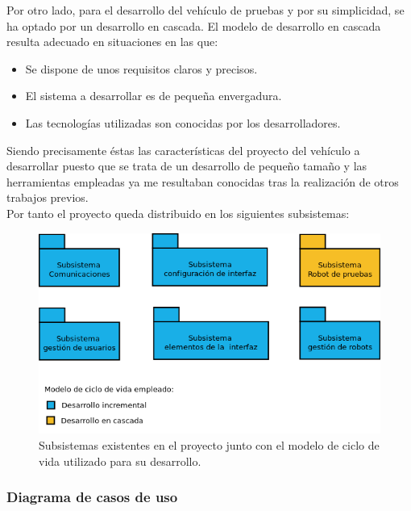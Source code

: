 Por otro lado, para el desarrollo del vehículo de pruebas y por su simplicidad, se ha optado por un desarrollo en cascada. El modelo de desarrollo en cascada resulta adecuado en situaciones
en las que:\\

\begin{itemize}
 \item Se dispone de unos requisitos claros y precisos.
 \item El sistema a desarrollar es de pequeña envergadura.
 \item Las tecnologías utilizadas son conocidas por los desarrolladores.
\end{itemize}

Siendo precisamente éstas las características del proyecto del vehículo a desarrollar puesto que se trata de un desarrollo de pequeño tamaño y las herramientas empleadas ya me resultaban conocidas
tras la realización de otros trabajos previos.\\

Por tanto el proyecto queda distribuido en los siguientes subsistemas:\\

\begin{figure}[H]
  \begin{center}
    \includegraphics[scale=.6]{diagramas/subsistemas.png}
  \end{center}
  \caption{Subsistemas existentes en el proyecto junto con el modelo de ciclo de vida
utilizado para su desarrollo.}
  \label{website:pagina-principal}
\end{figure}

\subsubsection{Diagrama de casos de uso}

